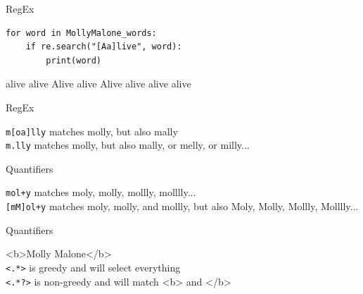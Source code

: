 \documentclass[handout]{beamer}
\begin{document}
\begin{frame}[fragile]{RegEx}

\begin{lstlisting}
for word in MollyMalone_words:
	if re.search("[Aa]live", word):
		print(word)
\end{lstlisting}
	
\begin{lstlistingoutput}
		alive
		alive
		Alive
		alive
		Alive
		alive
		alive
		alive
\end{lstlistingoutput}
	
	
\end{frame}



\begin{frame}[fragile]{RegEx}

\lstinline{m[oa]lly} matches molly, but also mally \\
\lstinline{m.lly} matches molly, but also mally, or melly, or milly...

	
	
\end{frame}


\begin{frame}[fragile]{Quantifiers}
	
\lstinline{mol+y} matches moly, molly, mollly, molllly...  \\
\lstinline{[mM]ol+y} matches moly, molly, and mollly, but also Moly, Molly, Mollly, Molllly... 
	
	

	
\end{frame}


\begin{frame}[fragile]{Quantifiers}
	
	<b>Molly Malone</b> \\
	\lstinline{<.*>} is greedy and will select everything   \\
	\lstinline{<.*?>} is non-greedy and will match <b> and </b>

	
	
	
\end{frame}
\end{document}
